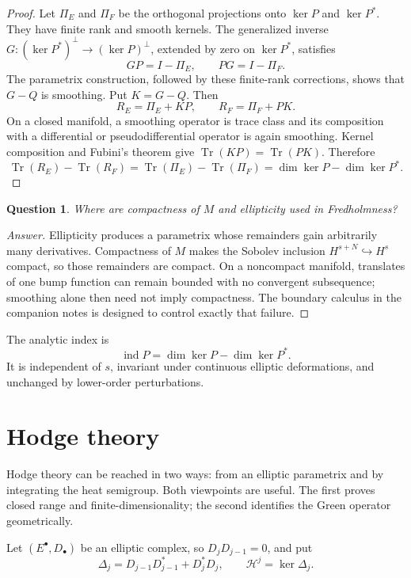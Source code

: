 \documentclass[11pt,oneside,reqno]{book}
\DeclareMathOperator{\Tr}{Tr}
\DeclareMathOperator{\ind}{ind}
\theoremstyle{plain}
\newtheorem{question}[theorem]{Question}
\theoremstyle{definition}
\theoremstyle{remark}
\newenvironment{answer}{\begin{proof}[Answer]}{\end{proof}}
\begin{document}
\begin{proof}
Let \(\Pi_E\) and \(\Pi_F\) be the orthogonal projections onto
\(\ker P\) and \(\ker P^*\).  They have finite rank and smooth kernels.
The generalized inverse \(G:(\ker P^*)^\perp\to(\ker P)^\perp\), extended
by zero on \(\ker P^*\), satisfies
\[
 GP=I-\Pi_E,\qquad PG=I-\Pi_F.
\]
The parametrix construction, followed by these finite-rank corrections,
shows that \(G-Q\) is smoothing.  Put \(K=G-Q\).  Then
\[
 R_E=\Pi_E+KP,
 \qquad
 R_F=\Pi_F+PK.
\]
On a closed manifold, a smoothing operator is trace class and its
composition with a differential or pseudodifferential operator is again
smoothing.  Kernel composition and Fubini's theorem give
\(\Tr(KP)=\Tr(PK)\).  Therefore
\[
 \Tr(R_E)-\Tr(R_F)
 =\Tr(\Pi_E)-\Tr(\Pi_F)
 =\dim\ker P-\dim\ker P^*.
\]
\end{proof}

\begin{question}
Where are compactness of \(M\) and ellipticity used in Fredholmness?
\end{question}

\begin{answer}
Ellipticity produces a parametrix whose remainders gain arbitrarily many
derivatives. Compactness of \(M\) makes the Sobolev inclusion
\(H^{s+N}\hookrightarrow H^s\) compact, so those remainders are compact.
On a noncompact manifold, translates of one bump function can remain
bounded with no convergent subsequence; smoothing alone then need not imply
compactness. The boundary calculus in the companion notes is designed to
control exactly that failure.
\end{answer}

The analytic index is
\[
 \ind P=\dim\ker P-\dim\ker P^*.
\]
It is independent of \(s\), invariant under continuous elliptic
deformations, and unchanged by lower-order perturbations.

\section{Hodge theory}

Hodge theory can be reached in two ways: from an elliptic parametrix and by
integrating the heat semigroup.  Both viewpoints are useful.  The first
proves closed range and finite-dimensionality; the
second identifies the Green operator geometrically.

Let \((E^\bullet,D_\bullet)\) be an elliptic complex, so
\(D_jD_{j-1}=0\), and put
\[
 \Delta_j=D_{j-1}D_{j-1}^*+D_j^*D_j,
 \qquad
 \mathcal H^j=\ker\Delta_j.
\]
\end{document}
